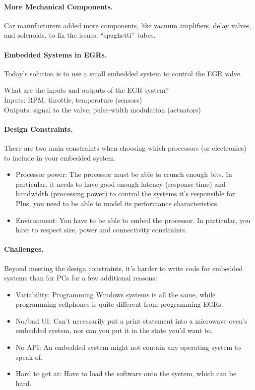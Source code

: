 \paragraph{More Mechanical Components.} Car manufacturers added more
components, like vacuum amplifiers, delay valves, and solenoids, to
fix the issues: ``spaghetti'' tubes.

\paragraph{Embedded Systems in EGRs.} Today's solution is to use a
small embedded system to control the EGR valve. 

What are the inputs and outputs of the EGR system?
\\[1em]
Inputs: RPM, throttle, temperature (sensors)\\
Outputs: signal to the valve; pulse-width modulation (actuators)

\paragraph{Design Constraints.} There are two main constraints when
choosing which processors (or electronics) to include in your embedded
system.

\begin{itemize}
\item Processor power: The processor must be able to crunch
enough bits. In particular, it needs to have good enough latency (response
time) and bandwidth (processing power) to control the systems it's
responsible for. Plus, you need to be able to model its performance
characteristics.
\item Environment: You have to be able to embed the processor. In particular,
you have to respect size, power and connectivity constraints.
\end{itemize}

\paragraph{Challenges.} Beyond meeting the design constraints, it's harder
to write code for embedded systems than for PCs for a few additional
reasons:

\begin{itemize}
\item Variability: Programming Windows systems is all the same, while
programming cellphones is quite different from programming EGRs.
\item No/bad UI: Can't necessarily put a print statement into a 
microwave oven's embedded system, nor can you put it in the state
you'd want to.
\item No API: An embedded system might not contain any operating system
to speak of.
\item Hard to get at: Have to load the software onto the system,
which can be hard.
\end{itemize}

